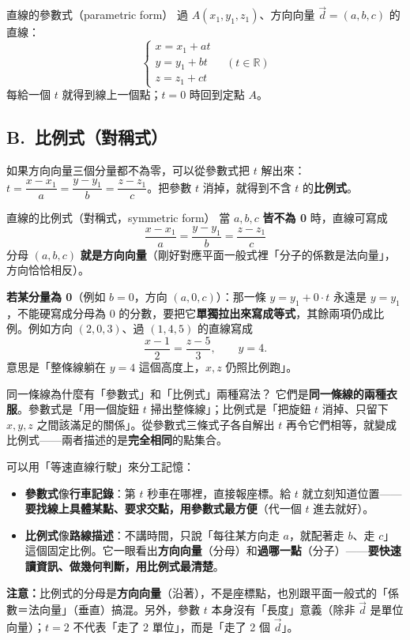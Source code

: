 \documentclass[11pt]{article}
\begin{document}

\begin{補充框}{直線的參數式（parametric form）}
過 $A(x_1,y_1,z_1)$、方向向量 $\vec d=(a,b,c)$ 的直線：
$$\boxed{\;\begin{cases}x=x_1+at\\[2pt]y=y_1+bt\\[2pt]z=z_1+ct\end{cases}\quad(t\in\mathbb{R})\;}$$
每給一個 $t$ 就得到線上一個點；$t=0$ 時回到定點 $A$。
\end{補充框}

\subsection*{\sffamily B.\ 比例式（對稱式）}

如果方向向量三個分量都不為零，可以從參數式把 $t$ 解出來：$t=\dfrac{x-x_1}{a}=\dfrac{y-y_1}{b}=\dfrac{z-z_1}{c}$。把參數 $t$ 消掉，就得到不含 $t$ 的\textbf{比例式}。

\begin{補充框}{直線的比例式（對稱式，symmetric form）}
當 $a,b,c$ \textbf{皆不為 0} 時，直線可寫成
$$\boxed{\;\frac{x-x_1}{a}=\frac{y-y_1}{b}=\frac{z-z_1}{c}\;}$$
分母 $(a,b,c)$ \textbf{就是方向向量}（剛好對應平面一般式裡「分子的係數是法向量」，方向恰恰相反）。

\textbf{若某分量為 0}（例如 $b=0$，方向 $(a,0,c)$）：那一條 $y=y_1+0\cdot t$ 永遠是 $y=y_1$，不能硬寫成分母為 0 的分數，要把它\textbf{單獨拉出來寫成等式}，其餘兩項仍成比例。例如方向 $(2,0,3)$、過 $(1,4,5)$ 的直線寫成
$$\frac{x-1}{2}=\frac{z-5}{3},\qquad y=4.$$
意思是「整條線躺在 $y=4$ 這個高度上，$x,z$ 仍照比例跑」。
\end{補充框}

\begin{補充框}{同一條線為什麼有「參數式」和「比例式」兩種寫法？}
它們是\textbf{同一條線的兩種衣服}。參數式是「用一個旋鈕 $t$ 掃出整條線」；比例式是「把旋鈕 $t$ 消掉、只留下 $x,y,z$ 之間該滿足的關係」。從參數式三條式子各自解出 $t$ 再令它們相等，就變成比例式——兩者描述的是\textbf{完全相同}的點集合。

可以用「等速直線行駛」來分工記憶：
\begin{itemize}\setlength{\itemsep}{1pt}
\item \textbf{參數式}像\textbf{行車記錄}：第 $t$ 秒車在哪裡，直接報座標。給 $t$ 就立刻知道位置——\textbf{要找線上具體某點、要求交點，用參數式最方便}（代一個 $t$ 進去就好）。
\item \textbf{比例式}像\textbf{路線描述}：不講時間，只說「每往某方向走 $a$，就配著走 $b$、走 $c$」這個固定比例。它一眼看出\textbf{方向向量}（分母）和\textbf{過哪一點}（分子）——\textbf{要快速讀資訊、做幾何判斷，用比例式最清楚}。
\end{itemize}
\textbf{注意：}比例式的分母是\textbf{方向向量}（沿著），不是座標點，也別跟平面一般式的「係數＝法向量」（垂直）搞混。另外，參數 $t$ 本身沒有「長度」意義（除非 $\vec d$ 是單位向量）；$t=2$ 不代表「走了 2 單位」，而是「走了 2 個 $\vec d$」。
\end{補充框}
\end{document}
